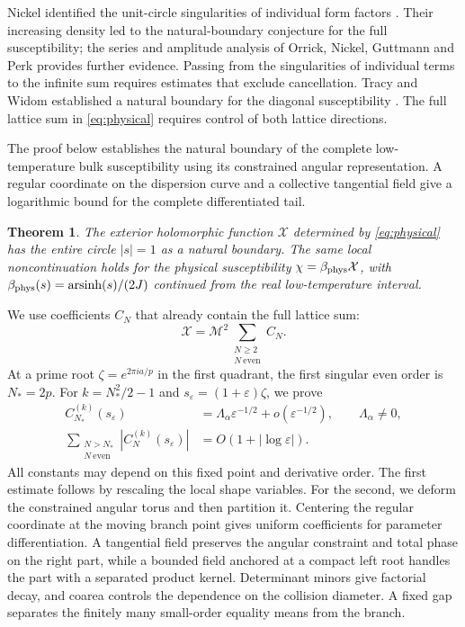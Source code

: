 \documentclass[11pt]{article}
\numberwithin{equation}{section}
\newtheorem{theorem}{Theorem}[section]
\theoremstyle{remark}\newtheorem{remark}[theorem]{Remark}
\newcommand{\X}{\mathcal X}
\newcommand{\Mtwo}{\mathcal M^2}
\begin{document}
Nickel identified the unit-circle singularities of individual form
factors \cite{Nickel1999,Nickel2000}. Their increasing density led to
the natural-boundary conjecture for the full susceptibility; the series
and amplitude analysis of Orrick, Nickel, Guttmann and Perk
\cite{Orrick2001} provides further evidence. Passing from the singularities
of individual terms to the infinite sum requires estimates that exclude
cancellation. Tracy and Widom established a natural boundary for the
diagonal susceptibility \cite{TracyWidomDiagonal}. The full lattice sum
in \eqref{eq:physical} requires control of both lattice directions.

The proof below establishes the natural boundary of the complete
low-temperature bulk susceptibility using its constrained angular
representation. A regular coordinate on the dispersion curve and a
collective tangential field give a logarithmic bound for the complete
differentiated tail.

\begin{theorem}\label{thm:main}
The exterior holomorphic function $\X$ determined by
\eqref{eq:physical} has the entire circle $|s|=1$ as a natural
boundary. The same local noncontinuation holds for the physical
susceptibility $\chi=\beta_{\rm phys}\X$, with
$\beta_{\rm phys}(s)=\operatorname{arsinh}(s)/(2J)$ continued from
the real low-temperature interval.
\end{theorem}

We use coefficients $C_N$ that already contain the full lattice sum:
\[
 \X=\Mtwo\sum_{\substack{N\ge2\\N\ \mathrm{even}}} C_N.
\]
At a prime root $\zeta=e^{2\pi ia/p}$ in the first quadrant,
the first singular even order is $N_*=2p$. For
$k=N_*^2/2-1$ and $s_\varepsilon=(1+\varepsilon)\zeta$, we prove
\begin{equation}\label{eq:two-goals}
 \begin{split}
 C_{N_*}^{(k)}(s_\varepsilon)
    &=\Lambda_\alpha\varepsilon^{-1/2}+o(\varepsilon^{-1/2}),
                  \qquad \Lambda_\alpha\ne0,\\
 \sum_{\substack{N>N_*\\N\ \mathrm{even}}}
          |C_N^{(k)}(s_\varepsilon)|
    &=O(1+|\log\varepsilon|).
 \end{split}
\end{equation}
All constants may depend on this fixed point and derivative order.
The first estimate follows by rescaling the local shape variables.
For the second, we deform the constrained angular torus and then
partition it. Centering the regular coordinate at the moving branch
point gives uniform coefficients for parameter differentiation. A
tangential field preserves the angular constraint and total phase on
the right part, while a bounded field anchored at a compact left root
handles the part with a separated product kernel. Determinant minors
give factorial decay, and coarea controls the dependence on the
collision diameter. A fixed gap separates the finitely many small-order
equality means from the branch.
\end{document}
